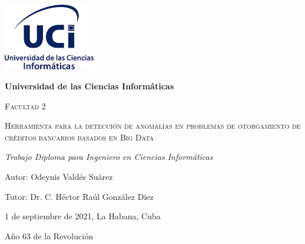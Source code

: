 \begin{titlepage}
	\centering
	{\includegraphics[width=0.3\textwidth]{UCI}\par}
	\vspace{1cm}
	{\bfseries\LARGE Universidad de las Ciencias Inform\'{a}ticas \par}
	\vspace{1cm}
	{\scshape\Large Facultad 2 \par}
	\vspace{1cm}
	{\scshape\Huge Herramienta para la detecci\'{o}n de anomal\'{i}as en problemas de otorgamiento de cr\'{e}ditos bancarios basados en Big Data \par}
	\vspace{1 cm}
	{\itshape\Large Trabajo Diploma para Ingeniero en Ciencias Inform\'{a}ticas \par}
	\vfill
	{\Large Autor: Odeynis Vald\'{e}s Su\'{a}rez \par}
	{\Large Tutor: Dr. C. H\'{e}ctor Ra\'{u}l Gonz\'{a}lez Diez \par}
	\vfill
	{\Large 1 de septiembre de 2021, La Habana, Cuba \par}
	{\Large A\~{n}o 63 de la Revoluci\'{o}n \par}
\end{titlepage}